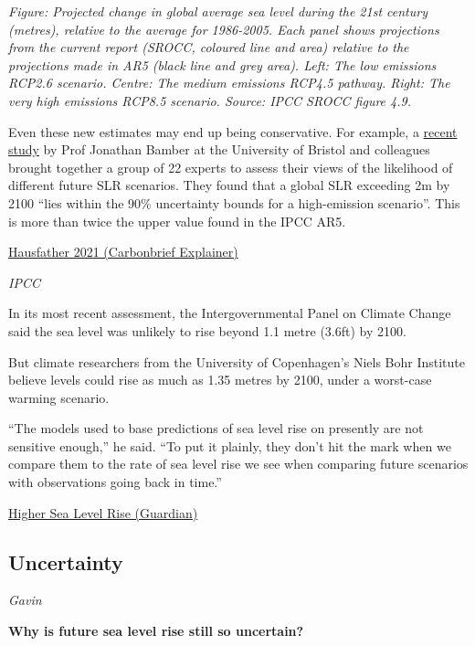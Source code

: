 \documentclass[
]{book}
\begin{document}
\emph{Figure: Projected change in global average sea level during the 21st century (metres), relative to the average for 1986-2005. Each panel shows projections from the current report (SROCC, coloured line and area) relative to the projections made in AR5 (black line and grey area). Left: The low emissions RCP2.6 scenario. Centre: The medium emissions RCP4.5 pathway. Right: The very high emissions RCP8.5 scenario. Source: IPCC SROCC figure 4.9.}

Even these new estimates may end up being conservative. For example, a \href{https://www.pnas.org/content/116/23/11195}{recent study} by Prof Jonathan Bamber at the University of Bristol and colleagues brought together a group of 22 experts to assess their views of the likelihood of different future SLR scenarios. They found that a global SLR exceeding 2m by 2100 ``lies within the 90\% uncertainty bounds for a high-emission scenario''. This is more than twice the upper value found in the IPCC AR5.

\href{https://www.carbonbrief.org/explainer-how-climate-change-is-accelerating-sea-level-rise}{Hausfather 2021 (Carbonbrief Explainer)}

\emph{IPCC}

In its most recent assessment, the Intergovernmental Panel on Climate Change said the sea level was unlikely to rise beyond 1.1 metre (3.6ft) by 2100.

But climate researchers from the University of Copenhagen's Niels Bohr Institute believe levels could rise as much as 1.35 metres by 2100, under a worst-case warming scenario.

``The models used to base predictions of sea level rise on presently are not sensitive enough,'' he said. ``To put it plainly, they don't hit the mark when we compare them to the rate of sea level rise we see when comparing future scenarios with observations going back in time.''

\href{https://www.theguardian.com/environment/2021/feb/02/sea-level-rise-could-be-worse-than-feared-warn-researchers}{Higher Sea Level Rise (Guardian)}

\hypertarget{uncertainty}{%
\subsection{Uncertainty}\label{uncertainty}}

\emph{Gavin}

\textbf{Why is future sea level rise still so uncertain?}
\end{document}
